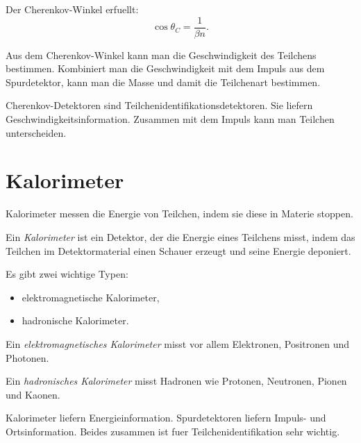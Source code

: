 \begin{formulabox}
Der Cherenkov-Winkel erfuellt:
\[
    \cos\theta_C = \frac{1}{\beta n}.
\]
\end{formulabox}

\begin{conceptbox}
Aus dem Cherenkov-Winkel kann man die Geschwindigkeit des Teilchens bestimmen.
Kombiniert man die Geschwindigkeit mit dem Impuls aus dem Spurdetektor, kann man
die Masse und damit die Teilchenart bestimmen.
\end{conceptbox}

\begin{examtipbox}
Cherenkov-Detektoren sind Teilchenidentifikationsdetektoren.
Sie liefern Geschwindigkeitsinformation.
Zusammen mit dem Impuls kann man Teilchen unterscheiden.
\end{examtipbox}

\section{Kalorimeter}

Kalorimeter messen die Energie von Teilchen, indem sie diese in Materie stoppen.

\begin{definitionbox}
Ein \emph{Kalorimeter} ist ein Detektor, der die Energie eines Teilchens misst,
indem das Teilchen im Detektormaterial einen Schauer erzeugt und seine Energie
deponiert.
\end{definitionbox}

\begin{conceptbox}
Es gibt zwei wichtige Typen:
\begin{itemize}
    \item elektromagnetische Kalorimeter,
    \item hadronische Kalorimeter.
\end{itemize}
\end{conceptbox}

\begin{definitionbox}
Ein \emph{elektromagnetisches Kalorimeter} misst vor allem Elektronen, Positronen
und Photonen.

Ein \emph{hadronisches Kalorimeter} misst Hadronen wie Protonen, Neutronen, Pionen
und Kaonen.
\end{definitionbox}

\begin{examtipbox}
Kalorimeter liefern Energieinformation.
Spurdetektoren liefern Impuls- und Ortsinformation.
Beides zusammen ist fuer Teilchenidentifikation sehr wichtig.
\end{examtipbox}

